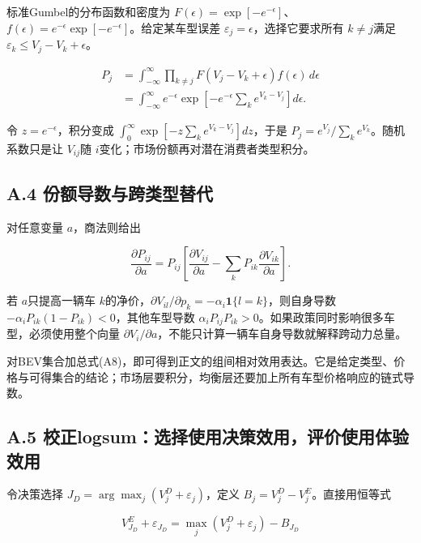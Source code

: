 \documentclass[
  11pt,
]{article}
\begin{document}
标准Gumbel的分布函数和密度为
\(F(\epsilon)=\exp[-e^{-\epsilon}]\)、\(f(\epsilon)=e^{-\epsilon}\exp[-e^{-\epsilon}]\)。给定某车型误差
\(\varepsilon_j=\epsilon\)，选择它要求所有 \(k\ne j\)满足
\(\varepsilon_k\leq V_j-V_k+\epsilon\)。

\[
\begin{aligned}
P_j
&=\int_{-\infty}^{\infty}\prod_{k\ne j}
F(V_j-V_k+\epsilon)f(\epsilon)\,d\epsilon\\
&=\int_{-\infty}^{\infty}e^{-\epsilon}
\exp\left[-e^{-\epsilon}\sum_ke^{V_k-V_j}\right]d\epsilon.
\end{aligned}\tag{A7}
\]

令 \(z=e^{-\epsilon}\)，积分变成
\(\int_0^\infty \exp[-z\sum_ke^{V_k-V_j}]dz\)，于是
\(P_j=e^{V_j}/\sum_ke^{V_k}\)。随机系数只是让 \(V_{ij}\)随
\(i\)变化；市场份额再对潜在消费者类型积分。

\subsection{A.4
份额导数与跨类型替代}\label{a.4-ux4efdux989dux5bfcux6570ux4e0eux8de8ux7c7bux578bux66ffux4ee3}

对任意变量 \(a\)，商法则给出

\[
\frac{\partial P_{ij}}{\partial a}
=P_{ij}\left[\frac{\partial V_{ij}}{\partial a}
-\sum_kP_{ik}\frac{\partial V_{ik}}{\partial a}\right].
\tag{A8}
\]

若 \(a\)只提高一辆车
\(k\)的净价，\(\partial V_{il}/\partial p_k=-\alpha_i\mathbf1\{l=k\}\)，则自身导数
\(-\alpha_iP_{ik}(1-P_{ik})<0\)，其他车型导数
\(\alpha_iP_{ij}P_{ik}>0\)。如果政策同时影响很多车型，必须使用整个向量
\(\partial V_i/\partial a\)，不能只计算一辆车自身导数就解释跨动力总量。

对BEV集合加总式(A8)，即可得到正文的组间相对效用表达。它是给定类型、价格与可得集合的结论；市场层要积分，均衡层还要加上所有车型价格响应的链式导数。

\subsection{A.5
校正logsum：选择使用决策效用，评价使用体验效用}\label{a.5-ux6821ux6b63logsumux9009ux62e9ux4f7fux7528ux51b3ux7b56ux6548ux7528ux8bc4ux4ef7ux4f7fux7528ux4f53ux9a8cux6548ux7528}

令决策选择 \(J_D=\arg\max_j(V_j^D+\varepsilon_j)\)，定义
\(B_j=V_j^D-V_j^E\)。直接用恒等式

\[
V_{J_D}^E+\varepsilon_{J_D}
=\max_j(V_j^D+\varepsilon_j)-B_{J_D}
\tag{A9}
\]
\end{document}

